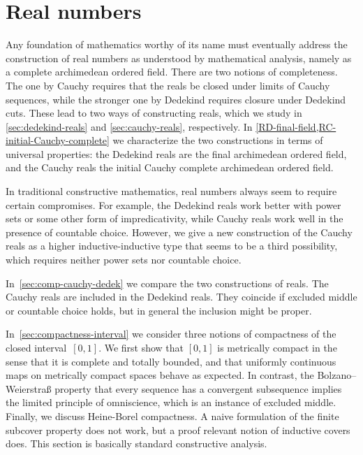\chapter{Real numbers}
\label{cha:real-numbers}

Any foundation of mathematics worthy of its name must eventually address the construction of real numbers as understood by mathematical analysis, namely as a complete archimedean ordered field.
There are two notions of completeness. The one by Cauchy requires that the reals be closed under limits of Cauchy sequences, while the stronger one by Dedekind requires closure under Dedekind cuts.
These lead to two ways of constructing reals, which we study in \autoref{sec:dedekind-reals} and \autoref{sec:cauchy-reals}, respectively. In \autoref{RD-final-field,RC-initial-Cauchy-complete} we characterize the two constructions in terms of universal properties: the Dedekind reals are the final archimedean ordered field, and the Cauchy reals the initial Cauchy complete archimedean ordered field.

In traditional constructive mathematics,
real numbers always seem to require certain compromises. For example, the Dedekind reals work better with power sets or some other form of impredicativity, while Cauchy reals work well in the presence of countable choice.
However, we give a new construction of the Cauchy reals as a higher inductive-inductive type that seems to be a third possibility, which requires neither power sets nor countable choice.

In~\autoref{sec:comp-cauchy-dedek} we compare the two constructions of reals. The Cauchy reals are included in the Dedekind reals. They coincide if excluded middle or countable choice holds, but in general the inclusion might be proper.

In~\autoref{sec:compactness-interval} we consider three notions of compactness of the closed interval~$[0,1]$. We first show that $[0,1]$ is metrically compact in the sense that it is complete and totally bounded, and that uniformly continuous maps on metrically compact spaces behave as expected. In contrast, the Bolzano--Weierstra\ss{} property that every sequence has a convergent subsequence implies the limited principle of omniscience, which is an instance of excluded middle. Finally, we discuss Heine-Borel compactness. A naive formulation of the finite subcover property does not work, but a proof relevant notion of inductive covers does.
This section is basically standard constructive analysis.

